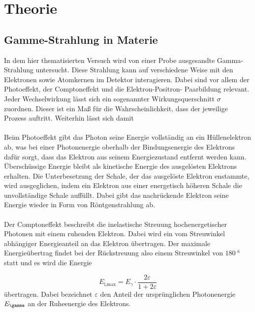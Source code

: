 \section{Theorie}
\label{sec:Theorie}


\subsection{Gamme-Strahlung in Materie}
\label{subsec:t1}

In dem hier thematisierten Versuch wird von einer Probe ausgesandte Gamma-Strahlung untersucht.
Diese Strahlung kann auf verschiedene Weise mit den Elektronen sowie Atomkernen im Detektor
interagieren.
Dabei sind vor allem der Photoeffekt, der Comptoneffekt und die Elektron-Positron-
Paarbildung relevant.
Jeder Wechselwirkung lässt sich ein sogenannter Wirkungsquerschnitt
$\sigma$ zuordnen. Dieser ist ein Maß für die Wahrscheinlichkeit,
dass der jeweilige Prozess auftritt. Weiterhin lässt sich damit \\ \\
Beim Photoeffekt gibt das Photon seine Energie vollständig an ein Hüllenelektron ab, was bei
einer Photonenergie oberhalb der Bindungsenergie des Elektrons dafür sorgt, dass das Elektron
aus seinem Energiezustand entfernt werden kann. Überschüssige Energie bleibt als kinetische
Energie des ausgelösten Elektrons erhalten. Die Unterbesetzung der Schale, der das ausgelöste
Elektron enstammte, wird ausgeglichen, indem ein Elektron aus einer energetisch höheren Schale
die unvollständige Schale auffüllt. Dabei gibt das nachrückende Elektron seine Energie wieder
in Form von Röntgenstrahlung ab. \\ \\
Der Comptoneffekt beschreibt die inelastische Streuung hochenergetischer Photonen mit einem
ruhenden Elektron.
Dabei wird ein vom Streuwinkel abhängiger Energieanteil an das Elektron übertragen.
Der maximale Energieübertrag findet bei der Rückstreuung also einem Streuwinkel
von $\SI{180}{\degree}$ statt und es wird die Energie

\begin{equation}
  \label{eqn:e1t1}
  E_\text{l,max} = E_{\gamma} \cdot \frac{2\varepsilon}{1 + 2\varepsilon}
\end{equation}
übertragen. Dabei bezeichnet $\varepsilon$ den Anteil der ursprünglichen
Photonenergie $E_{\gamme}$ an der Ruheenergie des Elektrons.

